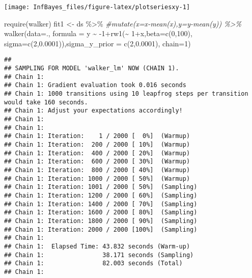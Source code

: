 \documentclass[
]{book}
\newenvironment{Shaded}{\begin{snugshade}}{\end{snugshade}}
\newcommand{\AttributeTok}[1]{\textcolor[rgb]{0.77,0.63,0.00}{#1}}
\newcommand{\CommentTok}[1]{\textcolor[rgb]{0.56,0.35,0.01}{\textit{#1}}}
\newcommand{\DecValTok}[1]{\textcolor[rgb]{0.00,0.00,0.81}{#1}}
\newcommand{\FloatTok}[1]{\textcolor[rgb]{0.00,0.00,0.81}{#1}}
\newcommand{\FunctionTok}[1]{\textcolor[rgb]{0.00,0.00,0.00}{#1}}
\newcommand{\NormalTok}[1]{#1}
\newcommand{\OtherTok}[1]{\textcolor[rgb]{0.56,0.35,0.01}{#1}}
\newcommand{\SpecialCharTok}[1]{\textcolor[rgb]{0.00,0.00,0.00}{#1}}
\begin{document}
\begin{center}\texttt{[image: InfBayes\_files/figure-latex/plotseriesxy-1]} \end{center}

\begin{Shaded}
\begin{Highlighting}[]
\FunctionTok{require}\NormalTok{(walker)}
\NormalTok{fit1 }\OtherTok{\textless{}{-}}\NormalTok{ ds }\SpecialCharTok{\%\textgreater{}\%} \CommentTok{\#mutate(x=x{-}mean(x),y=y{-}mean(y)) \%\textgreater{}\%}
  \FunctionTok{walker}\NormalTok{(}\AttributeTok{data=}\NormalTok{., }\AttributeTok{formula =}\NormalTok{ y }\SpecialCharTok{\textasciitilde{}} \SpecialCharTok{{-}}\DecValTok{1}\SpecialCharTok{+}\FunctionTok{rw1}\NormalTok{(}\SpecialCharTok{\textasciitilde{}} \DecValTok{1}\SpecialCharTok{+}\NormalTok{x,}\AttributeTok{beta=}\FunctionTok{c}\NormalTok{(}\DecValTok{0}\NormalTok{,}\DecValTok{100}\NormalTok{), }
    \AttributeTok{sigma=}\FunctionTok{c}\NormalTok{(}\DecValTok{2}\NormalTok{,}\FloatTok{0.0001}\NormalTok{)),}\AttributeTok{sigma\_y\_prior =} \FunctionTok{c}\NormalTok{(}\DecValTok{2}\NormalTok{,}\FloatTok{0.0001}\NormalTok{), }\AttributeTok{chain=}\DecValTok{1}\NormalTok{)}
\end{Highlighting}
\end{Shaded}

\begin{verbatim}
## 
## SAMPLING FOR MODEL 'walker_lm' NOW (CHAIN 1).
## Chain 1: 
## Chain 1: Gradient evaluation took 0.016 seconds
## Chain 1: 1000 transitions using 10 leapfrog steps per transition would take 160 seconds.
## Chain 1: Adjust your expectations accordingly!
## Chain 1: 
## Chain 1: 
## Chain 1: Iteration:    1 / 2000 [  0%]  (Warmup)
## Chain 1: Iteration:  200 / 2000 [ 10%]  (Warmup)
## Chain 1: Iteration:  400 / 2000 [ 20%]  (Warmup)
## Chain 1: Iteration:  600 / 2000 [ 30%]  (Warmup)
## Chain 1: Iteration:  800 / 2000 [ 40%]  (Warmup)
## Chain 1: Iteration: 1000 / 2000 [ 50%]  (Warmup)
## Chain 1: Iteration: 1001 / 2000 [ 50%]  (Sampling)
## Chain 1: Iteration: 1200 / 2000 [ 60%]  (Sampling)
## Chain 1: Iteration: 1400 / 2000 [ 70%]  (Sampling)
## Chain 1: Iteration: 1600 / 2000 [ 80%]  (Sampling)
## Chain 1: Iteration: 1800 / 2000 [ 90%]  (Sampling)
## Chain 1: Iteration: 2000 / 2000 [100%]  (Sampling)
## Chain 1: 
## Chain 1:  Elapsed Time: 43.832 seconds (Warm-up)
## Chain 1:                38.171 seconds (Sampling)
## Chain 1:                82.003 seconds (Total)
## Chain 1:
\end{verbatim}
\end{document}
